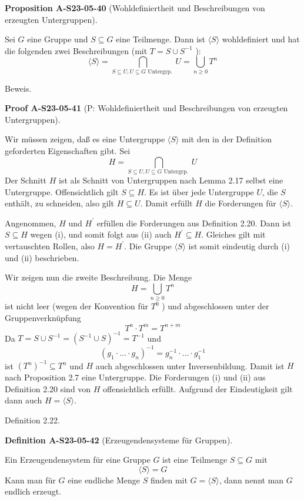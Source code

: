 \documentclass[10pt, letterpaper]{article}
\newcommand{\CustomHeading}[3]{%
  \par\medskip\noindent%
  \textbf{#1 #2} \textnormal{(#3)}.\enskip%
}
\newenvironment{DEF}[2]{\begin{unitbox}\CustomHeading{Definition}{#1}{#2}}{\end{unitbox}}
\newenvironment{PROP}[2]{\begin{unitbox}\CustomHeading{Proposition}{#1}{#2}}{\end{unitbox}}
\newenvironment{PROOF}[2]{\begin{unitbox}\CustomHeading{Proof}{#1}{#2}}{\end{unitbox}}
\begin{document}
\begin{PROP}{A-S23-05-40}{Wohldefiniertheit und Beschreibungen von erzeugten Untergruppen}
Sei $G$ eine Gruppe und $S \subseteq G$ eine Teilmenge. Dann ist $\langle S\rangle$ wohldefiniert und hat die folgenden zwei Beschreibungen (mit $T=S \cup S^{-1}$ ):
$$
\langle S\rangle=\bigcap_{S \subseteq U, U \subseteq G \text { Untergrp. }} U=\bigcup_{n \geq 0} T^{n}
$$
\end{PROP}


Beweis. 

\begin{PROOF}{A-S23-05-41}{P: Wohldefiniertheit und Beschreibungen von erzeugten Untergruppen}
Wir müssen zeigen, daß es eine Untergruppe $\langle S\rangle$ mit den in der Definition geforderten Eigenschaften gibt. Sei
$$
H=\bigcap_{S \subseteq U, U \subseteq G \text { Untergrp. }} U
$$
Der Schnitt $H$ ist als Schnitt von Untergruppen nach Lemma 2.17 selbst eine Untergruppe. Offensichtlich gilt $S \subseteq H$. Es ist über jede Untergruppe $U$, die $S$ enthält, zu schneiden, also gilt $H \subseteq U$. Damit erfüllt $H$ die Forderungen für $\langle S\rangle$.

Angenommen, $H$ und $H^{\prime}$ erfüllen die Forderungen aus Definition 2.20. Dann ist $S \subseteq H$ wegen (i), und somit folgt aus (ii) auch $H^{\prime} \subseteq H$. Gleiches gilt mit vertauschten Rollen, also $H=H^{\prime}$. Die Gruppe $\langle S\rangle$ ist somit eindeutig durch (i) und (ii) beschrieben.

Wir zeigen nun die zweite Beschreibung. Die Menge
$$
H=\bigcup_{n \geq 0} T^{n}
$$
ist nicht leer (wegen der Konvention für $T^{0}$ ) und abgeschlossen unter der Gruppenverknüpfung
$$
T^{n} \cdot T^{m}=T^{n+m}
$$
Da $T=S \cup S^{-1}=\left(S^{-1} \cup S\right)^{-1}=T^{-1}$ und
$$
\left(g_{1} \cdot \ldots \cdot g_{n}\right)^{-1}=g_{n}^{-1} \cdot \ldots \cdot g_{1}^{-1}
$$
ist $\left(T^{n}\right)^{-1} \subseteq T^{n}$ und $H$ auch abgeschlossen unter Inversenbildung. Damit ist $H$ nach Proposition 2.7 eine Untergruppe. Die Forderungen (i) und (ii) aus Definition 2.20 sind von $H$ offensichtlich erfüllt. Aufgrund der Eindeutigkeit gilt dann auch $H=\langle S\rangle$.
\end{PROOF}



Definition 2.22. 


\begin{DEF}{A-S23-05-42}{Erzeugendensysteme für Gruppen}
Ein Erzeugendensystem für eine Gruppe $G$ ist eine Teilmenge $S \subseteq G$ mit
$$
\langle S\rangle=G
$$
Kann man für $G$ eine endliche Menge $S$ finden mit $G=\langle S\rangle$, dann nennt man $G$ endlich erzeugt.
\end{DEF}
\end{document}
